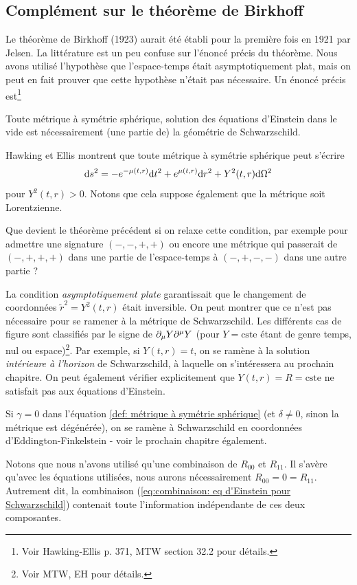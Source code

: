 \subsection{Complément sur le théorème de Birkhoff}
Le théorème de Birkhoff (1923) aurait été établi pour la première fois en 1921 par Jelsen. La littérature est un peu confuse sur l'énoncé précis du théorème. Nous avons utilisé l'hypothèse que l'espace-temps était asymptotiquement plat, mais on peut en fait prouver que cette hypothèse n'était pas nécessaire. Un énoncé précis est\footnote{Voir Hawking-Ellis p. 371, MTW section 32.2 pour détails.}
\begin{theoremframe}
    \begin{theorem}[de Birkhoff]
        Toute métrique à symétrie sphérique, solution des équations d'Einstein dans le vide est nécessairement (une partie de) la géométrie de Schwarzschild.
    \end{theorem}
\end{theoremframe}
Hawking et Ellis montrent que toute métrique à symétrie sphérique peut s'écrire
\begin{equation}
    \mathrm{d} s^2 = - e^{-\mu(t,r)} \mathrm{d} t^2 + e^{\mu(t,r)} \mathrm{d} r^2 + Y^2(t,r) \mathrm{d} \Omega^2
\end{equation}
pour $Y^2(t,r) >0$. Notons que cela suppose également que la métrique soit Lorentzienne. 
\begin{exerc}
    Que devient le théorème précédent si on relaxe cette condition, par exemple pour admettre une signature $(-,-,+,+)$ ou encore une métrique qui passerait de $(-,+,+,+)$ dans une partie de l'espace-temps à $(-,+,-,-)$ dans une autre partie ?
\end{exerc}
La condition \emph{asymptotiquement plate} garantissait que le changement de coordonnées $\tilde{r}^2 = Y^2(t,r)$ était inversible. On peut montrer que ce n'est pas nécessaire pour se ramener à la métrique de Schwarzschild. Les différents cas de figure sont classifiés par le signe de $\partial_\mu Y \partial^\mu Y$ (pour $Y = \text{cste}$ étant de genre temps, nul ou espace)\footnote{Voir MTW, EH pour détails.}.
Par exemple, si $Y(t,r) = t$, on se ramène à la solution \emph{intérieure à l'horizon} de Schwarzschild, à laquelle on s'intéressera au prochain chapitre. On peut également vérifier explicitement que $Y(t,r) = R = \text{cste}$ ne satisfait pas aux équations d'Einstein.
\begin{rmk}
    Si $\gamma = 0$ dans l'équation \ref{def: métrique à symétrie sphérique} (et $\delta \neq 0$, sinon la métrique est dégénérée), on se ramène à Schwarzschild en coordonnées d'Eddington-Finkelstein - voir le prochain chapitre également.
\end{rmk}
\begin{rmk}
    Notons que nous n'avons utilisé qu'une combinaison de $R_{00}$ et $R_{11}$. Il s'avère qu'avec les équations utilisées, nous aurons nécessairement $R_{00} = 0 = R_{11}$. Autrement dit, la combinaison (\ref{eq:combinaison: eq d'Einstein pour Schwarzschild}) contenait toute l'information indépendante de ces deux composantes.
\end{rmk}
